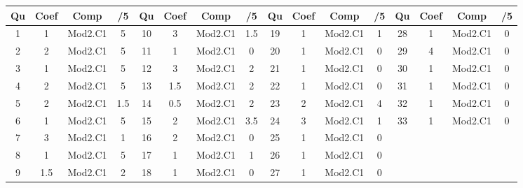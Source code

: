 \footnotesize 
\begin{center} 
\begin{tabular}{|c|c|c|c||c|c|c|c||c|c|c|c||c|c|c|c|} 
\hline \textbf{Qu} & \textbf{Coef} & \textbf{Comp} & \textbf{/5} & \textbf{Qu} & \textbf{Coef} & \textbf{Comp} & \textbf{/5} & \textbf{Qu} & \textbf{Coef} & \textbf{Comp} & \textbf{/5} & \textbf{Qu} & \textbf{Coef} & \textbf{Comp} & \textbf{/5} \\ 
\hline 
\hline 
1 & 1 & Mod2.C1 & 5 & 10 & 3 & Mod2.C1 & 1.5 & 19 & 1 & Mod2.C1 & 1 & 28 & 1 & Mod2.C1 & 0 \\ 
2 & 2 & Mod2.C1 & 5 & 11 & 1 & Mod2.C1 & 0 & 20 & 1 & Mod2.C1 & 0 & 29 & 4 & Mod2.C1 & 0 \\ 
3 & 1 & Mod2.C1 & 5 & 12 & 3 & Mod2.C1 & 2 & 21 & 1 & Mod2.C1 & 0 & 30 & 1 & Mod2.C1 & 0 \\ 
4 & 2 & Mod2.C1 & 5 & 13 & 1.5 & Mod2.C1 & 2 & 22 & 1 & Mod2.C1 & 0 & 31 & 1 & Mod2.C1 & 0 \\ 
5 & 2 & Mod2.C1 & 1.5 & 14 & 0.5 & Mod2.C1 & 2 & 23 & 2 & Mod2.C1 & 4 & 32 & 1 & Mod2.C1 & 0 \\ 
6 & 1 & Mod2.C1 & 5 & 15 & 2 & Mod2.C1 & 3.5 & 24 & 3 & Mod2.C1 & 1 & 33 & 1 & Mod2.C1 & 0 \\ 
7 & 3 & Mod2.C1 & 1 & 16 & 2 & Mod2.C1 & 0 & 25 & 1 & Mod2.C1 & 0 &  &  &  &  \\ 
8 & 1 & Mod2.C1 & 5 & 17 & 1 & Mod2.C1 & 1 & 26 & 1 & Mod2.C1 & 0 &  &  &  &  \\ 
9 & 1.5 & Mod2.C1 & 2 & 18 & 1 & Mod2.C1 & 0 & 27 & 1 & Mod2.C1 & 0 &  &  &  &  \\ 
\hline 
\end{tabular} 
\end{center} 
\normalsize 
